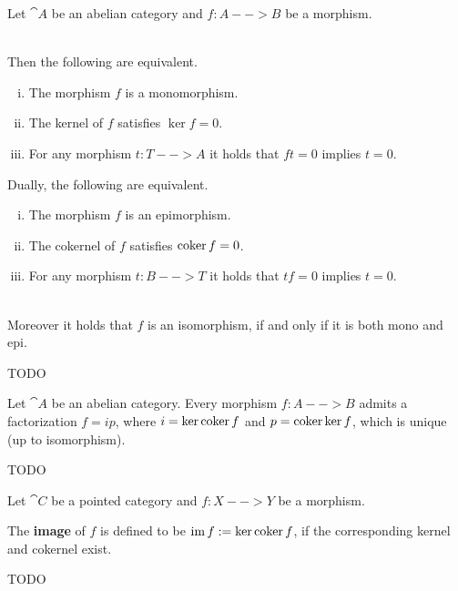 	\begin{proposition}
		Let $\cat{A}$ be an abelian category and $f:A-->B$ be a morphism.
		
		~\\
		Then the following are equivalent.
		\begin{enumerate}[(i)]
			\item{
				The morphism $f$ is a monomorphism.
			}
			\item{
				The kernel of $f$ satisfies $\ker f = 0$.
			}
			\item{
				For any morphism $t:T-->A$ it holds that $ft = 0$ implies $t = 0$.
			}
		\end{enumerate}
		Dually, the following are equivalent.
		\begin{enumerate}[(i)]
			\item{
				The morphism $f$ is an epimorphism.
			}
			\item{
				The cokernel of $f$ satisfies $\operatorname{coker} f = 0$.
			}
			\item{
				For any morphism $t:B-->T$ it holds that $tf = 0$ implies $t = 0$.
			}
		\end{enumerate}

		~\\
		Moreover it holds that $f$ is an isomorphism, if and only if it is both mono and epi.
	\end{proposition}
	\begin{sketch}
		TODO
	\end{sketch}

	\begin{theorem}
		Let $\cat{A}$ be an abelian category. Every morphism $f:A-->B$ admits a factorization $f=ip$, where $i = \ker \operatorname{coker} f$ and $p = \operatorname{coker} \ker f$, which is unique (up to isomorphism).
	\end{theorem}
	\begin{sketch}
		TODO
	\end{sketch}

	\begin{definition}[image]
		Let $\cat{C}$ be a pointed category and $f:X-->Y$ be a morphism.

		The \textbf{image} of $f$ is defined to be $\operatorname{im} f := \ker \operatorname{coker} f$, if the corresponding kernel and cokernel exist.
	\end{definition}

	\begin{theorem}
		TODO
	\end{theorem}

